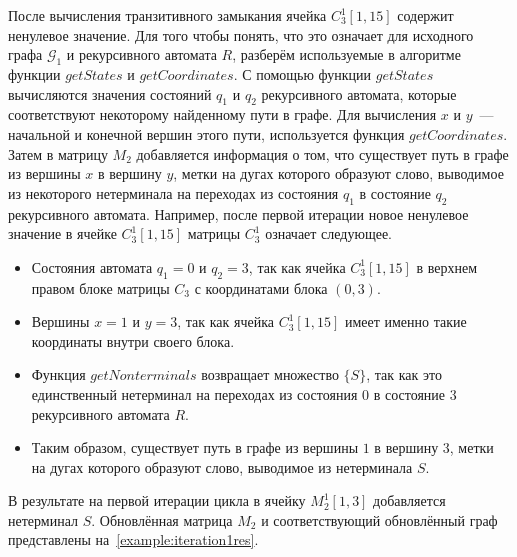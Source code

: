 После вычисления транзитивного замыкания ячейка $C_3^1[1, 15]$ содержит ненулевое значение. Для того чтобы понять, что это означает для исходного графа $\mathcal{G}_1$ и рекурсивного автомата $R$, разберём используемые в алгоритме функции $\textit{getStates}$ и $\textit{getCoordinates}$. С помощью функции $\textit{getStates}$ вычисляются значения состояний $q_1$ и $q_2$ рекурсивного автомата, которые соответствуют некоторому найденному пути в графе. Для вычисления $x$ и $y$~--- начальной и конечной вершин этого пути, используется функция $\textit{getCoordinates}$. Затем в матрицу $M_2$ добавляется информация о том, что существует путь в графе из вершины $x$ в вершину $y$, метки на дугах которого образуют слово, выводимое из некоторого нетерминала на переходах из состояния $q_1$ в состояние $q_2$ рекурсивного автомата. Например, после первой итерации новое ненулевое значение в ячейке $C_3^1[1, 15]$ матрицы $C_3^1$ означает следующее.
\begin{itemize}
    \item Состояния автомата $q_1 = 0$ и $q_2 = 3$, так как ячейка $C_3^1[1, 15]$ в верхнем правом блоке матрицы $C_3$ с координатами блока $(0, 3)$.
    \item Вершины $x = 1$ и $y = 3$, так как ячейка $C_3^1[1, 15]$ имеет именно такие координаты внутри своего блока.
    \item Функция $\textit{getNonterminals}$ возвращает множество $\{S\}$, так как это единственный нетерминал на переходах из состояния $0$ в состояние $3$ рекурсивного автомата $R$.
    \item Таким образом, существует путь в графе из вершины $1$ в вершину $3$, метки на дугах которого образуют слово, выводимое из нетерминала $S$.
\end{itemize}

В результате на первой итерации цикла в ячейку $M_2^1[1, 3]$ добавляется нетерминал $S$. Обновлённая матрица $M_2$ и соответствующий обновлённый граф представлены на~\cref{example:iteration1res}.


